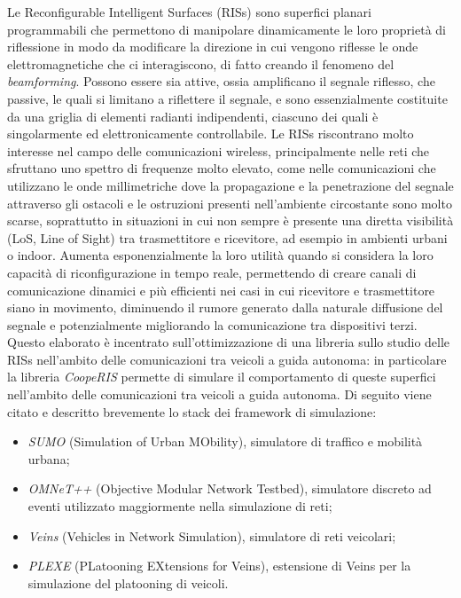 Le Reconfigurable Intelligent Surfaces (RISs)\cite{ris} sono superfici planari
programmabili che permettono di manipolare dinamicamente le loro proprietà di
riflessione in modo da modificare la direzione in cui vengono riflesse le onde
elettromagnetiche che ci interagiscono, di fatto creando il fenomeno del \textit{beamforming}.
Possono essere sia attive, ossia amplificano il segnale riflesso, che passive,
le quali si limitano a riflettere il segnale, e sono essenzialmente costituite da
una griglia di elementi radianti indipendenti, ciascuno dei quali è
singolarmente ed elettronicamente controllabile. Le RISs riscontrano molto interesse
nel campo delle comunicazioni wireless, principalmente nelle reti che sfruttano
uno spettro di frequenze molto elevato, come nelle comunicazioni che utilizzano le
onde millimetriche dove la propagazione e la penetrazione del segnale attraverso
gli ostacoli e le ostruzioni presenti nell'ambiente circostante sono molto scarse,
soprattutto in situazioni in cui non sempre è presente una diretta visibilità (LoS,
Line of Sight) tra trasmettitore e ricevitore, ad esempio in ambienti urbani o
indoor. Aumenta esponenzialmente la loro utilità quando si considera la loro capacità
di riconfigurazione in tempo reale, permettendo di creare canali di
comunicazione dinamici e più efficienti nei casi in cui ricevitore e
trasmettitore siano in movimento, diminuendo il rumore generato dalla naturale diffusione
del segnale e potenzialmente migliorando la comunicazione tra dispositivi terzi.
Questo elaborato è incentrato sull'ottimizzazione di una libreria sullo studio
delle RISs nell'ambito delle comunicazioni tra veicoli a guida autonoma: in particolare
la libreria \textit{CoopeRIS}\cite{cooperis} permette di simulare il comportamento
di queste superfici nell'ambito delle comunicazioni tra veicoli a guida autonoma.
Di seguito viene citato e descritto brevemente lo stack dei framework di
simulazione:
\begin{itemize}
  \item \textit{SUMO} (Simulation of Urban MObility), simulatore di traffico e mobilità
    urbana\cite{sumo};

  \item \textit{OMNeT++} (Objective Modular Network Testbed), simulatore discreto
    ad eventi utilizzato maggiormente nella simulazione di reti\cite{omnetpp};

  \item \textit{Veins} (Vehicles in Network Simulation), simulatore di reti veicolari\cite{veins};

  \item \textit{PLEXE} (PLatooning EXtensions for Veins), estensione di Veins per
    la simulazione del platooning di veicoli\cite{plexe}.
\end{itemize}

